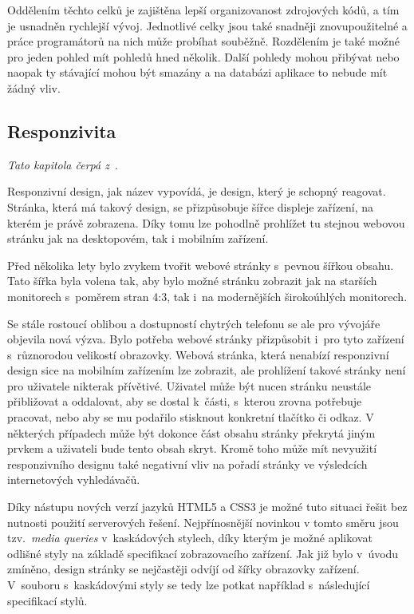 Oddělením těchto celků je zajištěna lepší organizovanost zdrojových kódů, a tím je usnadněn rychlejší vývoj. Jednotlivé celky jsou také snadněji znovupoužitelné a práce programátorů na nich může probíhat souběžně. Rozdělením je také možné pro jeden pohled mít pohledů hned několik. Další pohledy mohou přibývat nebo naopak ty stávající mohou být smazány a na databázi aplikace to nebude mít žádný vliv.


\subsection{Responzivita}
\emph{Tato kapitola čerpá z~\cite{bib:responsive}}.

Responzivní design, jak název vypovídá, je design, který je schopný reagovat. Stránka, která má takový design, se přizpůsobuje šířce displeje zařízení, na kterém je právě zobrazena. Díky tomu lze pohodlně prohlížet tu stejnou webovou stránku jak na desktopovém, tak i mobilním zařízení. 

Před několika lety bylo zvykem tvořit webové stránky s~pevnou šířkou obsahu. Tato šířka byla volena tak, aby bylo možné stránku zobrazit jak na starších monitorech s~poměrem stran 4:3, tak i~na modernějších širokoúhlých monitorech. 

Se stále rostoucí oblibou a dostupností chytrých telefonu se ale pro vývojáře objevila nová výzva. Bylo potřeba webové stránky přizpůsobit i~pro tyto zařízení s~různorodou velikostí obrazovky. Webová stránka, která nenabízí responzivní design sice na mobilním zařízením lze zobrazit, ale prohlížení takové stránky není pro uživatele nikterak přívětivé. Uživatel může být nucen stránku neustále přibližovat a oddalovat, aby se dostal k~části, s~kterou zrovna potřebuje pracovat, nebo aby se mu podařilo stisknout konkretní tlačítko či odkaz. V některých případech může být dokonce část obsahu stránky překrytá jiným prvkem a uživateli bude tento obsah skryt. Kromě toho může mít nevyužití responzivního designu také negativní vliv na pořadí stránky ve výsledcích internetových vyhledávačů.

Díky nástupu nových verzí jazyků HTML5 a CSS3 je možné tuto situaci řešit bez nutnosti použití serverových řešení. Nejpřínosnější novinkou v tomto směru jsou tzv.~\emph{media queries} v~kaskádových stylech, díky kterým je možné aplikovat odlišné styly na základě specifikací zobrazovacího zařízení. Jak již bylo v~úvodu zmíněno, design stránky se nejčastěji odvíjí od šířky obrazovky zařízení. V~souboru s~kaskádovými styly se tedy lze potkat například s~následující specifikací stylů.

